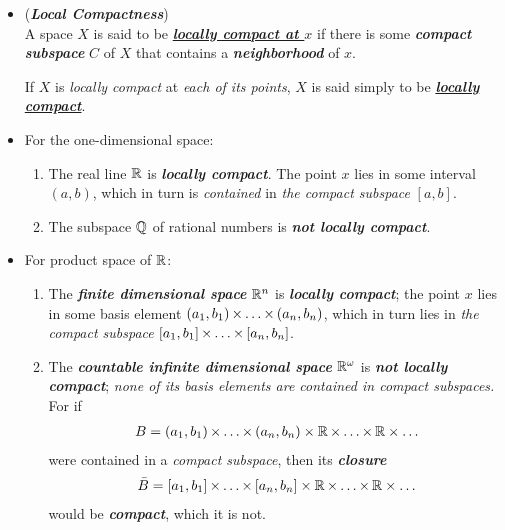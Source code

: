 \documentclass[11pt]{article}
\begin{document}
\begin{itemize}
\item \begin{definition} (\emph{\textbf{Local Compactness}})\\
A space $X$ is said to be \underline{\emph{\textbf{locally compact at $x$}}} if there is some \emph{\textbf{compact subspace}} $C$ of $X$ that contains a \emph{\textbf{neighborhood}} of $x$. 

If $X$ is \emph{locally compact} at \emph{each of its points}, $X$ is said simply to be \underline{\emph{\textbf{locally compact}}}.
\end{definition}

\item \begin{example} 
For the one-dimensional space:
\begin{enumerate}
\item The real line ${\mathbb R}$ is \emph{\textbf{locally compact}}. The point $x$ lies in some interval $(a, b)$, which in turn is \emph{contained} in \emph{the compact subspace} $[a, b]$. 
\item The subspace ${\mathbb Q}$ of rational numbers is \emph{\textbf{not locally compact}}.
\end{enumerate}
\end{example}


\item \begin{example}
For product space of ${\mathbb R}$:
\begin{enumerate}
\item The \emph{\textbf{finite dimensional space}} ${\mathbb R}^n$ is \emph{\textbf{locally compact}}; the point $x$ lies in some basis element
$(a_1, b_1) \,{\times}\ldots{\times}\, (a_n, b_n)$, which in turn lies in \emph{the compact subspace} $[a_1, b_1] \,{\times}\ldots{\times}\, [a_n, b_n]$.
\item The \emph{\textbf{countable infinite dimensional space}} ${\mathbb R}^{\omega}$ is \emph{\textbf{not locally compact}}; \emph{none of its basis elements are contained in compact
subspaces.} For if
\begin{align*}
B = (a_1, b_1) \,{\times}\ldots{\times}\, (a_n, b_n) \times {\mathbb R} \,{\times}\ldots{\times}\, {\mathbb R} \times \ldots
\end{align*}
were contained in a \emph{compact subspace}, then its \emph{\textbf{closure}}
\begin{align*}
\bar{B} = [a_1, b_1] \,{\times}\ldots{\times}\, [a_n, b_n] \times {\mathbb R} \,{\times}\ldots{\times}\, {\mathbb R} \times \ldots
\end{align*}
would be \emph{\textbf{compact}}, which it is not.
\end{enumerate} 
\end{example}


\end{itemize}
\end{document}
